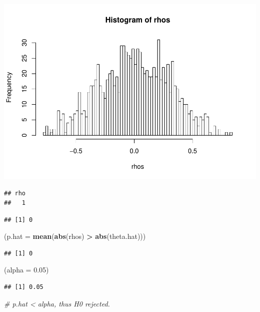 \documentclass[
]{article}
\newenvironment{Shaded}{\begin{snugshade}}{\end{snugshade}}
\newcommand{\CommentTok}[1]{\textcolor[rgb]{0.56,0.35,0.01}{\textit{#1}}}
\newcommand{\DataTypeTok}[1]{\textcolor[rgb]{0.13,0.29,0.53}{#1}}
\newcommand{\FloatTok}[1]{\textcolor[rgb]{0.00,0.00,0.81}{#1}}
\newcommand{\KeywordTok}[1]{\textcolor[rgb]{0.13,0.29,0.53}{\textbf{#1}}}
\newcommand{\NormalTok}[1]{#1}
\newcommand{\OperatorTok}[1]{\textcolor[rgb]{0.81,0.36,0.00}{\textbf{#1}}}
\newcommand{\StringTok}[1]{\textcolor[rgb]{0.31,0.60,0.02}{#1}}
\begin{document}
\includegraphics{428HW5-yutingd3_files/figure-latex/unnamed-chunk-18-1.pdf}

\begin{Shaded}
\end{Shaded}

\begin{verbatim}
## rho 
##   1
\end{verbatim}

\begin{Shaded}
\end{Shaded}

\begin{verbatim}
## [1] 0
\end{verbatim}

\begin{Shaded}
\begin{Highlighting}[]
\NormalTok{(}\DataTypeTok{p.hat =} \KeywordTok{mean}\NormalTok{(}\KeywordTok{abs}\NormalTok{(rhos) }\OperatorTok{>}\StringTok{ }\KeywordTok{abs}\NormalTok{(theta.hat)))}
\end{Highlighting}
\end{Shaded}

\begin{verbatim}
## [1] 0
\end{verbatim}

\begin{Shaded}
\begin{Highlighting}[]
\NormalTok{(}\DataTypeTok{alpha =} \FloatTok{0.05}\NormalTok{)}
\end{Highlighting}
\end{Shaded}

\begin{verbatim}
## [1] 0.05
\end{verbatim}

\begin{Shaded}
\begin{Highlighting}[]
\CommentTok{# p.hat < alpha, thus H0 rejected.}
\end{Highlighting}
\end{Shaded}
\end{document}
